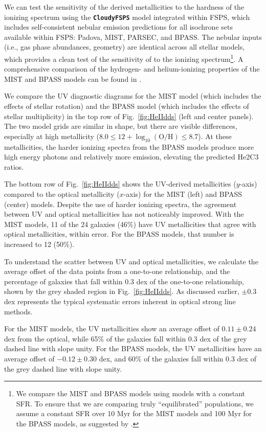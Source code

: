 \documentclass[preprint2]{aastex62}
\newcommand{\FSPS}{{\sc FSPS}\xspace}
\newcommand{\CloudyFSPS}{{\tt \textbf{CloudyFSPS}}\xspace}
\newcommand{\heii}{\ion{He}{2}}
\newcommand{\Myr}{$\,$Myr\xspace}
\newcommand{\logten}{\ensuremath{\log_{10}}}
\newcommand{\logOH}{\ensuremath{\logten (\mathrm{O}/\mathrm{H})}\xspace}
\begin{document}
We can test the sensitivity of the derived metallicities to the hardness of the ionizing spectrum using the \CloudyFSPS model integrated within \FSPS \citep{Byler+2017}, which includes self-consistent nebular emission predictions for all isochrone sets available within FSPS: Padova, MIST, PARSEC, and BPASS. The nebular inputs (i.e., gas phase abundances, geometry) are identical across all stellar models, which provides a clean test of the sensitivity of \heii{} to the ionizing spectrum\footnote{We compare the MIST and BPASS models using models with a constant SFR. To ensure that we are comparing truly ``equilibrated'' populations, we assume a constant SFR over 10\,\Myr for the MIST models and 100\,\Myr for the BPASS models, as suggested by \citet{Xiao+2018}.}. A comprehensive comparison of the hydrogen- and helium-ionizing properties of the MIST and BPASS models can be found in \citet{Choi+2017}.

We compare the UV diagnostic diagrams for the MIST model (which includes the effects of stellar rotation) and the BPASS model (which includes the effects of stellar multiplicity) in the top row of Fig.~\ref{fig:HeIIdds} (left and center panels). The two model grids are similar in shape, but there are visible differences, especially at high metallicity ($8.0 \leq 12+\logOH \leq 8.7$). At these metallicities, the harder ionizing spectra from the BPASS models produce more high energy photons and relatively more \heii{} emission, elevating the predicted He2C3 ratios.

The bottom row of Fig.~\ref{fig:HeIIdds} shows the UV-derived metallicities ($y$-axis) compared to the optical metallicity ($x$-axis) for the MIST (left) and BPASS (center) models. Despite the use of harder ionizing spectra, the agreement between UV and optical metallicities has not noticeably improved. With the MIST models, 11 of the 24 galaxies (46\%) have UV metallicities that agree with optical metallicities, within error. For the BPASS models, that number is increased to 12 (50\%). 

To understand the scatter between UV and optical metallicities, we calculate the average offset of the data points from a one-to-one relationship, and the percentage of galaxies that fall within $0.3$ dex of the one-to-one relationship, shown by the grey shaded region in Fig.~\ref{fig:HeIIdds}. As discussed earlier, $\pm 0.3$ dex represents the typical systematic errors inherent in optical strong line methods.

For the MIST models, the UV metallicities show an average offset of $0.11 \pm 0.24$ dex from the optical, while 65\% of the galaxies fall within 0.3 dex of the grey dashed line with slope unity. For the BPASS models, the UV metallicities have an average offset of $-0.12 \pm 0.30$ dex, and 60\% of the galaxies fall within 0.3 dex of the grey dashed line with slope unity.
\end{document}
